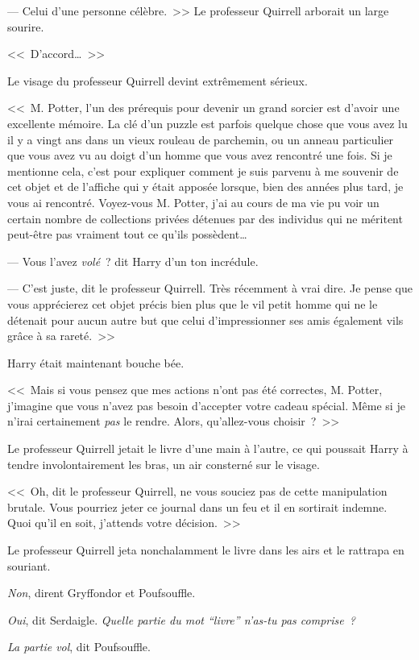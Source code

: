 --- Celui d'une personne célèbre.~>> Le professeur Quirrell arborait un large sourire.

<<~D'accord…~>>

Le visage du professeur Quirrell devint extrêmement sérieux.

<<~M. Potter, l'un des prérequis pour devenir un grand sorcier est d'avoir une excellente mémoire. La clé d'un puzzle est parfois quelque chose que vous avez lu il y a vingt ans dans un vieux rouleau de parchemin, ou un anneau particulier que vous avez vu au doigt d'un homme que vous avez rencontré une fois. Si je mentionne cela, c'est pour expliquer comment je suis parvenu à me souvenir de cet objet et de l'affiche qui y était apposée lorsque, bien des années plus tard, je vous ai rencontré. Voyez-vous M. Potter, j'ai au cours de ma vie pu voir un certain nombre de collections privées détenues par des individus qui ne méritent peut-être pas vraiment tout ce qu'ils possèdent…

--- Vous l'avez \emph{volé}~? dit Harry d'un ton incrédule.

--- C'est juste, dit le professeur Quirrell. Très récemment à vrai dire. Je pense que vous apprécierez cet objet précis bien plus que le vil petit homme qui ne le détenait pour aucun autre but que celui d'impressionner ses amis également vils grâce à sa rareté.~>>

Harry était maintenant bouche bée.

<<~Mais si vous pensez que mes actions n'ont pas été correctes, M. Potter, j'imagine que vous n'avez pas besoin d'accepter votre cadeau spécial. Même si je n'irai certainement \emph{pas} le rendre. Alors, qu'allez-vous choisir~?~>>

Le professeur Quirrell jetait le livre d'une main à l'autre, ce qui poussait Harry à tendre involontairement les bras, un air consterné sur le visage.

<<~Oh, dit le professeur Quirrell, ne vous souciez pas de cette manipulation brutale. Vous pourriez jeter ce journal dans un feu et il en sortirait indemne. Quoi qu'il en soit, j'attends votre décision.~>>

Le professeur Quirrell jeta nonchalamment le livre dans les airs et le rattrapa en souriant.

\emph{Non}, dirent Gryffondor et Poufsouffle.

\emph{Oui}, dit Serdaigle. \emph{Quelle partie du mot “livre” n'as-tu pas comprise~?}

\emph{La partie vol}, dit Poufsouffle.

